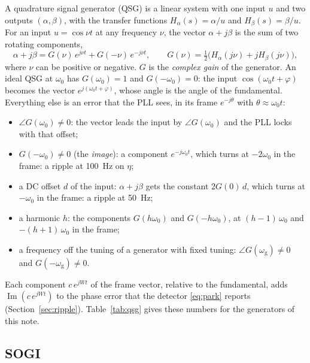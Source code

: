 \documentclass[11pt,a4paper]{scrartcl}
\newcommand{\ped}[1]{_{\mathrm{#1}}}
\begin{document}
\begin{onehalfspace}
A quadrature signal generator (QSG) is a linear system with one input $u$ and two outputs $(\alpha, \beta)$, with the transfer functions $H_\alpha(s) = \alpha/u$ and $H_\beta(s) = \beta/u$. For an input $u = \cos\nu t$ at any frequency $\nu$, the vector $\alpha + j\beta$ is the sum of two rotating components,
\begin{equation}
	\alpha + j\beta = G(\nu)\, e^{j\nu t} + G(-\nu)\, e^{-j\nu t}, \qquad G(\nu) = \tfrac{1}{2}\big(H_\alpha(j\nu) + j H_\beta(j\nu)\big),
	\label{eq:cgain}
\end{equation}
where $\nu$ can be positive or negative. $G$ is the \emph{complex gain} of the generator. An ideal QSG at $\omega_0$ has $G(\omega_0) = 1$ and $G(-\omega_0) = 0$: the input $\cos(\omega_0 t + \varphi)$ becomes the vector $e^{j(\omega_0 t + \varphi)}$, whose angle is the angle of the fundamental. Everything else is an error that the PLL sees, in its frame $e^{-j\theta}$ with $\theta \approx \omega_0 t$:
\begin{itemize}[nosep]
	\item $\angle G(\omega_0) \neq 0$: the vector leads the input by $\angle G(\omega_0)$ and the PLL locks with that offset;
	\item $G(-\omega_0) \neq 0$ (the \emph{image}): a component $e^{-j\omega_0 t}$, which turns at $-2\omega_0$ in the frame: a ripple at \SI{100}{\hertz} on $\eta$;
	\item a DC offset $d$ of the input: $\alpha + j\beta$ gets the constant $2G(0)\,d$, which turns at $-\omega_0$ in the frame: a ripple at \SI{50}{\hertz};
	\item a harmonic $h$: the components $G(h\omega_0)$ and $G(-h\omega_0)$, at $(h-1)\,\omega_0$ and $-(h+1)\,\omega_0$ in the frame;
	\item a frequency off the tuning of a generator with fixed tuning: $\angle G(\omega\ped{g}) \neq 0$ and $G(-\omega\ped{g}) \neq 0$.
\end{itemize}
Each component $c\,e^{jWt}$ of the frame vector, relative to the fundamental, adds $\operatorname{Im}(c\,e^{jWt})$ to the phase error that the detector \eqref{eq:park} reports (Section~\ref{sec:ripple}). Table~\ref{tab:qsg} gives these numbers for the generators of this note.

\subsection{SOGI}
\label{sec:sogi}


\end{onehalfspace}
\end{document}
